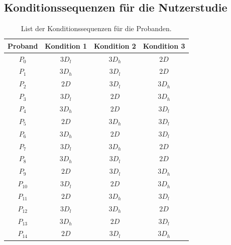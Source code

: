 \begin{appendices}
\chapter{Konditionssequenzen für die Nutzerstudie}
\begin{table}[h]
    \centering
    \caption{List der Konditionssequenzen für die Probanden.}
    \label{appendix:condition_sequences}
    \begin{tabular}{cccc}\toprule
        Proband & Kondition 1 & Kondition 2 & Kondition 3 \\\midrule
        $P_0$ & $3D_l$ & $3D_h$ & $2D$ \\
        $P_1$ & $3D_h$ & $3D_l$ & $2D$ \\
        $P_2$ & $2D$ & $3D_l$ & $3D_h$ \\
        $P_3$ & $3D_l$ & $2D$ & $3D_h$ \\
        $P_4$ & $3D_h$ & $2D$ & $3D_l$ \\
        $P_5$ & $2D$ & $3D_h$ & $3D_l$ \\
        $P_6$ & $3D_h$ & $2D$ & $3D_l$ \\
        $P_7$ & $3D_l$ & $3D_h$ & $2D$ \\
        $P_8$ & $3D_h$ & $3D_l$ & $2D$ \\
        $P_9$ & $2D$ & $3D_l$ & $3D_h$ \\
        $P_{10}$ & $3D_l$ & $2D$ & $3D_h$ \\
        $P_{11}$ & $2D$ & $3D_h$ & $3D_l$ \\
        $P_{12}$ & $3D_l$ & $3D_h$ & $2D$ \\
        $P_{13}$ & $3D_h$ & $2D$ & $3D_l$ \\
        $P_{14}$ & $2D$ & $3D_l$ & $3D_h$ \\\bottomrule        
    \end{tabular}
\end{table}
    
\end{appendices}
